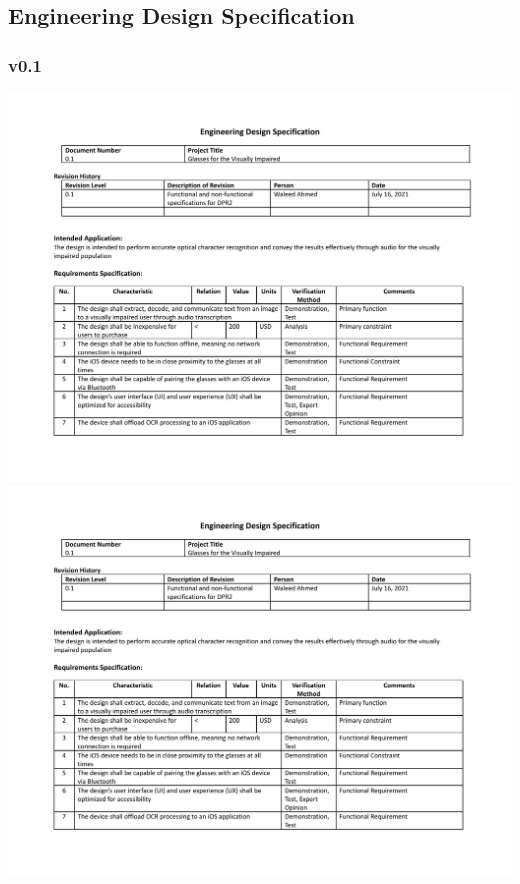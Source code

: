 \documentclass[a4paper,11pt]{article}
\begin{document}
\begin{landscape}
    \subsection{Engineering Design Specification}
    \subsubsection{v0.1}
    \begin{center}
        \includegraphics[page=1,width={0.86\linewidth}]{pdf/eds_0.1.pdf}
        \newpage
        \includegraphics[page=2,width={0.86\linewidth}]{pdf/eds_0.1.pdf}
    \end{center}
    

\end{landscape}
\end{document}

